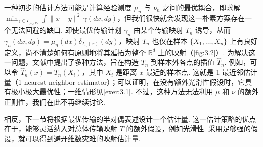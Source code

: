 一种初步的估计方法可能是计算经验测度 $\mu_n$ 与 $\nu_n$ 之间的最优耦合，即求解 $\min_{\gamma\in\Gamma_{\mu_n,\nu_n}}\int\|x-y\|^2\,\gamma(dx,dy)$，但我们很快就会发现这一朴素方案存在一个无法回避的缺口. 即使最优传输计划 $\gamma_n$ 由某个传输映射 $T_n$ 诱导，从而 $\gamma_n(dx,dy)=\mu_n(dx)\delta_{T_n(x)}(dy)$，映射 $T_n$ 也仅在样本 $\{X_1,\ldots,X_n\}$ 上有良好定义，尚不清楚如何有原则地将其延拓为整个 $\mathbb R^d$ 上的映射（\autoref{fig:3.2}）. 为解决这一问题，文献中提出了多种方法，旨在构造 $T_n$ 到样本外各点的插值 $\widehat T_n$. 例如，可以令 $\widehat T_n(x)=T_n(X_i)$，其中 $X_i$ 是距离 $x$ 最近的样本点. 这就是 1-最近邻估计量（1-nearest neighbor estimator）；可以证明，在没有额外光滑性假设时，它具有极小极大最优性\cite{ref221}；一维情形见\autoref{exer:3.1}. 不过，这种方法无法利用 $\mu$ 和 $\nu$ 的额外正则性，我们在此不再继续讨论.

相反，下一节将根据最优传输的半对偶表述设计一个估计量. 这一估计策略的优点在于，能够灵活纳入对总体传输映射 $T$ 的额外假设，例如光滑性. 采用足够强的假设，就可以得到避开维数灾难的映射估计量.
